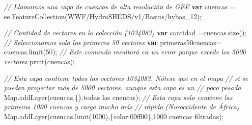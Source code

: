 \documentclass[
  12pt,
  letterpaper,
  twoside]{book}
\newenvironment{Shaded}{\begin{snugshade}}{\end{snugshade}}
\newcommand{\BuiltInTok}[1]{#1}
\newcommand{\CommentTok}[1]{\textcolor[rgb]{0.24,0.58,0.00}{\textit{#1}}}
\newcommand{\DataTypeTok}[1]{\textcolor[rgb]{0.00,0.00,0.00}{#1}}
\newcommand{\DecValTok}[1]{\textcolor[rgb]{0.28,0.53,0.93}{#1}}
\newcommand{\FunctionTok}[1]{\textcolor[rgb]{0.48,0.12,0.64}{#1}}
\newcommand{\KeywordTok}[1]{\textcolor[rgb]{0.00,0.00,0.00}{\textbf{#1}}}
\newcommand{\NormalTok}[1]{#1}
\newcommand{\OperatorTok}[1]{\textcolor[rgb]{0.00,0.00,0.00}{#1}}
\newcommand{\StringTok}[1]{\textcolor[rgb]{0.87,0.29,0.22}{#1}}
\begin{document}
\begin{Shaded}
\begin{Highlighting}[]
\CommentTok{// Llamamos una capa de cuencas de alta resolución de GEE}
\KeywordTok{var}\NormalTok{ cuencas }\OperatorTok{=}\NormalTok{ ee}\OperatorTok{.}\FunctionTok{FeatureCollection}\NormalTok{(}\StringTok{\textquotesingle{}WWF/HydroSHEDS/v1/Basins/hybas\_12\textquotesingle{}}\NormalTok{)}\OperatorTok{;}

\CommentTok{// Cantidad de vectores en la colección (1034083)}
\KeywordTok{var}\NormalTok{ cantidad }\OperatorTok{=}\NormalTok{cuencas}\OperatorTok{.}\FunctionTok{size}\NormalTok{()}\OperatorTok{;} 
\CommentTok{// Seleccionamos solo los primeros 50 vectores}
\KeywordTok{var}\NormalTok{ primeras50cuencas}\OperatorTok{=}\NormalTok{ cuencas}\OperatorTok{.}\FunctionTok{limit}\NormalTok{(}\DecValTok{50}\NormalTok{)}\OperatorTok{;} 
\CommentTok{// Este comando resultará en un error porque excede los 5000 vectores}
\FunctionTok{print}\NormalTok{(cuencas)}\OperatorTok{;} 

\CommentTok{// Esta capa contiene todos los vectores 1034083. Nótese que en el mapa }
\CommentTok{// sí se pueden proyectar más de 5000 vectores, aunque esta capa es un }
\CommentTok{// poco pesada }
\BuiltInTok{Map}\OperatorTok{.}\FunctionTok{addLayer}\NormalTok{(cuencas}\OperatorTok{,}\NormalTok{\{\}}\OperatorTok{,}\StringTok{\textquotesingle{}todas las cuencas\textquotesingle{}}\NormalTok{)}\OperatorTok{;}
\CommentTok{// Esta capa solo contiene las primeras 1000 cuencas y carga mucho más }
\CommentTok{// rápido (Noroccidente de África)}
\BuiltInTok{Map}\OperatorTok{.}\FunctionTok{addLayer}\NormalTok{(cuencas}\OperatorTok{.}\FunctionTok{limit}\NormalTok{(}\DecValTok{1000}\NormalTok{)}\OperatorTok{,}\NormalTok{\{}\DataTypeTok{color}\OperatorTok{:}\StringTok{\textquotesingle{}00ff00\textquotesingle{}}\NormalTok{\}}\OperatorTok{,}\StringTok{\textquotesingle{}1000 cuencas filtradas\textquotesingle{}}\NormalTok{)}\OperatorTok{;}
\end{Highlighting}
\end{Shaded}
\end{document}
